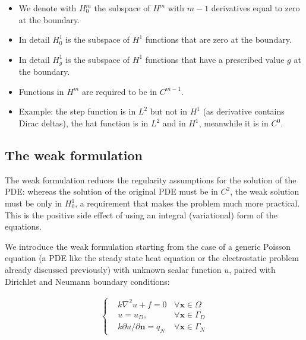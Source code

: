 \documentclass{digitaldynamics}
\def\vect#1{\bm{#1}}
\begin{document}
\begin{itemize}
\begin{itemize}
		\item We denote with $H^m_0$ the subspace of $H^m$ with $m-1$ derivatives equal to zero at the boundary.
		
		\item In detail $H^1_0$ is the subspace of $H^1$ functions that are zero at the boundary. 
		
		\item In detail $H^1_g$ is the subspace of $H^1$ functions that have a prescribed value $g$ at the boundary.
		
		\item Functions in $H^m$ are required to be in $C^{m-1}$.
		
		\item Example: the step function is in $L^2$ but not in $H^1$ (as derivative contains Dirac deltas), the hat function is in $L^2$ and in $H^1$, meanwhile it is in $C^0$. 
		
	\end{itemize}
	
\end{itemize}

\subsection{The weak formulation}

The weak formulation reduces the regularity assumptions for the solution of the PDE: whereas the solution of the original PDE must be in $C^2$, the weak solution must be only in $H^1_0$, a requirement that makes the problem much more practical. This is the positive side effect of using an integral (variational) form of the equations. 

We introduce the weak formulation starting from the case of a generic Poisson equation (a PDE like the steady state heat equation or the electrostatic problem already discussed previously) with unknown scalar function $u$, paired with Dirichlet and Neumann boundary conditions:

\begin{align}
\boxed{
	\left\{
	\begin{aligned}
			& k\nabla^2 u + f = 0	& \forall \vect{x}\in\Omega \\ 
			& u=u_D, \; 					& \forall \vect{x}\in\Gamma_D \\
			& k\partial{u}/\partial{\vect{n}}=q_N \; & \forall \vect{x}\in\Gamma_N
	\end{aligned}
	\right.
	\label{eq:strongpoisson}
	}
\end{align}
\end{document}

